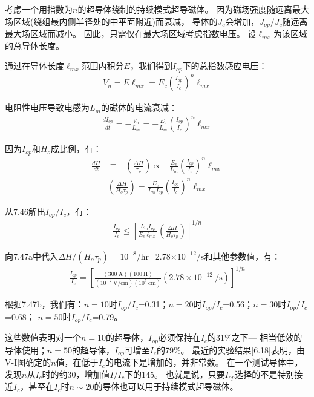 考虑一个用指数为$n$的超导体绕制的持续模式超导磁体。
因为磁场强度随远离最大场区域(绕组最内侧半径处的中平面附近)而衰减，
导体的$J_c$会增加，$J_{op}/J_c$随远离最大场区域而减小。
因此，只需仅在最大场区域考虑指数电压。
设$\ell_{mx}$为该区域的总导体长度。

通过在导体长度$\ell_{mx}$范围内积分$E$，我们得到$I_{op}$下的总指数感应电压：
\begin{align*}%
V_n=E\ell_{mx}=E_c\left(\frac{I_{op}}{I_c}\right)^n\ell_{mx} \tag{7.44}
\end{align*}

电阻性电压导致电感为$L_m$的磁体的电流衰减：
\begin{align*}%
\frac{dI_{op}}{dt}=-\frac{V_n}{L_m}=-\frac{E_c}{L_m}\left(\frac{I_{op}}{I_c}\right)^n\ell_{mx} \tag{7.45}
\end{align*}

因为$I_{op}$和$H_o$成比例，有：
\begin{align*}%
\frac{dH}{dt}&\equiv-\left(\frac{\Delta H}{\tau_p}\right)\propto-\frac{E_c}{L_m}\left(\frac{I_{op}}{I_c}\right)^n\ell_{mx}\\
&\left(\frac{\Delta H}{H_o\tau_p}\right)=\frac{E_c}{L_m I_{op}}\left(\frac{I_{op}}{I_c}\right)^n\ell_{mx}\tag{7.46}
\end{align*}

从7.46解出$I_{op}/I_c$，有：
\begin{align*}%
\frac{I_{op}}{I_c}\leq\left[\frac{L_mI_{op}}{E_c\ell_{mx}}\left(\frac{\Delta H}{H_o\tau_p}\right)\right]^{1/n} \tag{7.47a}
\end{align*}

向7.47a中代入$\Delta H/(H_o \tau_p)=10^{-8}$/hr=2.78$\times 10^{-12}$/s和其他参数值，有：
\begin{align*}%
\frac{I_{op}}{I_c}=\left[\frac{(300\ \mathrm{A})(100\ \mathrm{H})}{(10^{-7}\ \mathrm{V/cm})(10^5\ \mathrm{cm})}(2.78\times 10^{-12}\ \mathrm{/s})\right]^{1/n} \tag{7.47b}
\end{align*}

根据7.47b，我们有：$n=10$时$I_{op}/I_c$=0.31；$n=20$时$I_{op}/I_c$=0.56；$n=30$时$I_{op}/I_c$=0.68；
$n=50$时$I_{op}/I_c$=0.79。

这些数值表明对一个$n=10$的超导体，$I_{op}$必须保持在$I_c$的31\%之下---
相当低效的导体使用；$n=50$的超导体，$I_{op}$可增至$I_c$的79\%。
最近的实验结果[6.18]表明，由V-I图确定的$n$值，在低于$I_c$的电流下是增加的，并非常数。
在一个测试导体中，发现$n$从$I_c$时的约30，增加值$I/I_c$下的145。
也就是说，只要$I_{op}$选择的不是特别接近$I_c$，甚至在$I_c$时$n\sim 20$的导体也可以用于持续模式超导磁体。

